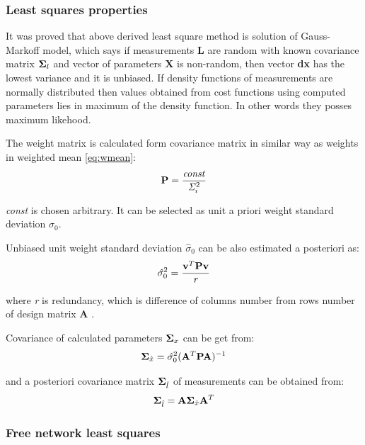 \documentclass[a4paper,12pt]{article}
\newcommand{\ematr}[1]{
{\bf #1}
}
\newcommand{\evect}[1]{
{\bf #1}
}
\newcommand{\escal}[1]{
{\it #1}
}
\begin{document}
\subsubsection{Least squares properties}

It was proved that above derived least square method is solution of Gauss-Markoff model, which 
says if measurements \evect{L} are random with known covariance matrix $\ematr{\Sigma}_{l}$  and vector of parameters \evect{X} is non-random, then
vector \evect{dx}  has the lowest variance and it is unbiased. If density functions of measurements are normally 
distributed then values obtained from cost functions using  computed parameters lies in maximum of the density
function. In other words they posses maximum likehood.

The weight matrix is calculated form covariance matrix in similar way as weights in weighted mean \eqref{eq:wmean}:
\begin{equation}
\ematr{P} = \frac{\escal{const}}{\escal{\Sigma}_{i}^{2}}
\end{equation} 

\escal{const} is chosen arbitrary. It can be selected as unit a priori weight standard deviation $\sigma_{0}$. 


Unbiased unit weight standard deviation $\hat{\sigma}_{0}$ can be also estimated a posteriori as:
\begin{equation}
\escal{\hat{\sigma}}_{0}^{2} = \frac{\evect{v}^{T} \ematr{P}  \evect{v}}{\escal{r}}
\end{equation} 

where \escal{r} is redundancy, which is difference of columns number from rows number of design matrix \ematr{A}.

Covariance of calculated parameters $\ematr{\Sigma}_{x}$ can be get from:
\begin{equation}
\ematr{\Sigma}_{\hat{x}} = \escal{\hat{\sigma}}_{0}^{2} (\ematr{A}^{T} \ematr{P} \ematr{A})^{-1}
\end{equation} 

and a posteriori covariance matrix $\ematr{\Sigma}_{\hat{l}}$ of measurements can be obtained from:
\begin{equation}
\ematr{\Sigma}_{\hat{l}} =  \ematr{A} \ematr{\Sigma}_{\hat{x}} \ematr{A}^{T}
\end{equation} 

\subsubsection{Free network least squares}
\label{sec:free_net_least}
\end{document}
